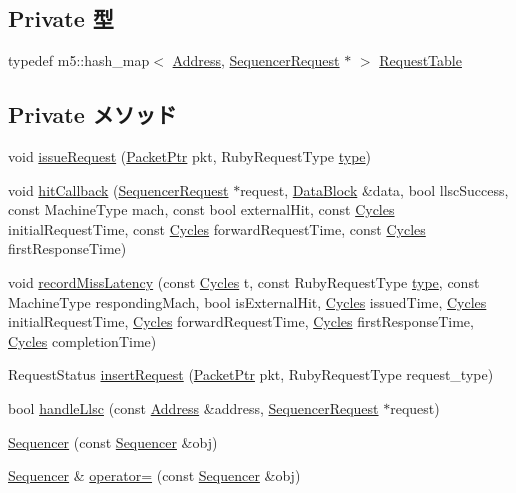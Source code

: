 \subsection*{Private 型}
\begin{DoxyCompactItemize}
\item 
typedef m5::hash\_\-map$<$ \hyperlink{classAddress}{Address}, \hyperlink{structSequencerRequest}{SequencerRequest} $\ast$ $>$ \hyperlink{classSequencer_ab8b07c7968ec41f243eeb0c53e459bb8}{RequestTable}
\end{DoxyCompactItemize}
\subsection*{Private メソッド}
\begin{DoxyCompactItemize}
\item 
void \hyperlink{classSequencer_adf180308d81a9eade08f190a0b220c6d}{issueRequest} (\hyperlink{classPacket}{PacketPtr} pkt, RubyRequestType \hyperlink{classSequencer_1_1RubyPort_acce15679d830831b0bbe8ebc2a60b2ca}{type})
\item 
void \hyperlink{classSequencer_ae5b978643179033488a1153899c085e5}{hitCallback} (\hyperlink{structSequencerRequest}{SequencerRequest} $\ast$request, \hyperlink{classDataBlock}{DataBlock} \&data, bool llscSuccess, const MachineType mach, const bool externalHit, const \hyperlink{classCycles}{Cycles} initialRequestTime, const \hyperlink{classCycles}{Cycles} forwardRequestTime, const \hyperlink{classCycles}{Cycles} firstResponseTime)
\item 
void \hyperlink{classSequencer_a37b774f897c19e6a2a84d89aeb3f5b45}{recordMissLatency} (const \hyperlink{classCycles}{Cycles} t, const RubyRequestType \hyperlink{classSequencer_1_1RubyPort_acce15679d830831b0bbe8ebc2a60b2ca}{type}, const MachineType respondingMach, bool isExternalHit, \hyperlink{classCycles}{Cycles} issuedTime, \hyperlink{classCycles}{Cycles} initialRequestTime, \hyperlink{classCycles}{Cycles} forwardRequestTime, \hyperlink{classCycles}{Cycles} firstResponseTime, \hyperlink{classCycles}{Cycles} completionTime)
\item 
RequestStatus \hyperlink{classSequencer_ad7e26bff5c0772136a69fc46fb6b6b21}{insertRequest} (\hyperlink{classPacket}{PacketPtr} pkt, RubyRequestType request\_\-type)
\item 
bool \hyperlink{classSequencer_add40b4adaa2c154a2c81fcebc9ff4aaf}{handleLlsc} (const \hyperlink{classAddress}{Address} \&address, \hyperlink{structSequencerRequest}{SequencerRequest} $\ast$request)
\item 
\hyperlink{classSequencer_a59cf565c114ce83354332f4f49b9add0}{Sequencer} (const \hyperlink{classSequencer}{Sequencer} \&obj)
\item 
\hyperlink{classSequencer}{Sequencer} \& \hyperlink{classSequencer_ad3a4eee2c15f83ff25ee60d438602e6b}{operator=} (const \hyperlink{classSequencer}{Sequencer} \&obj)
\end{DoxyCompactItemize}
